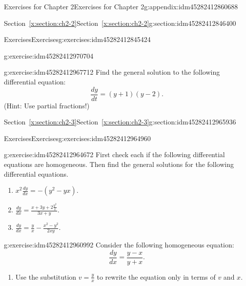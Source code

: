 \documentclass[oneside,10pt,]{book}
\numberwithin{equation}{section}
\numberwithin{equation}{section}
\begin{document}
\begin{appendixptx}{Exercises for Chapter 2}{}{Exercises for Chapter 2}{}{}{g:appendix:idm45282412860688}
\begin{sectionptx}{Section~\ref*{x:section:ch2-2}}{}{Section~\ref*{x:section:ch2-2}}{}{}{g:section:idm45282412846400}
\begin{exercises-subsection-numberless}{Exercises}{}{Exercises}{}{}{g:exercises:idm45282412845424}
\begin{divisionexercise}{2}{}{}{g:exercise:idm45282412970704}
\begin{enumerate}[label=(\alph*)]
\end{enumerate}
\end{divisionexercise}%
\begin{divisionexercise}{3}{}{}{g:exercise:idm45282412967712}%
Find the general solution to the following differential equation:%
\begin{equation*}
\frac{dy}{dt}=\left(y+1\right)\left(y-2\right).
\end{equation*}
(Hint: Use partial fractions!)%
\end{divisionexercise}%
\end{exercises-subsection-numberless}
\end{sectionptx}
%
%
\typeout{************************************************}
\typeout{************************************************}
%
\begin{sectionptx}{Section~\ref*{x:section:ch2-3}}{}{Section~\ref*{x:section:ch2-3}}{}{}{g:section:idm45282412965936}
%
%
\typeout{************************************************}
\typeout{************************************************}
%
\begin{exercises-subsection-numberless}{Exercises}{}{Exercises}{}{}{g:exercises:idm45282412964960}
\begin{divisionexercise}{1}{}{}{g:exercise:idm45282412964672}%
First check each if the following differential equations are homogeneous. Then find the general solutions for the following differential equations.%
\begin{enumerate}[label=(\alph*)]
\item{}\({\displaystyle x^{2}\frac{dy}{dx}=-\left(y^{2}-yx\right).}\)%
\item{}\({\displaystyle \frac{dy}{dx}=\frac{x+3y+2\frac{y^{2}}{x}}{3x+y}.}\)%
\item{}\({\displaystyle \frac{dy}{dx}=\frac{y}{x}-\frac{x^{2}-y^{2}}{2xy}.}\)%
\end{enumerate}
%
\end{divisionexercise}%
\begin{divisionexercise}{2}{}{}{g:exercise:idm45282412960992}%
Consider the following homogeneous equation:%
\begin{equation*}
\frac{dy}{dx}=\frac{y-x}{y+x}.
\end{equation*}
%
\begin{enumerate}[label=(\alph*)]
\item{}Use the substitution \(v=\frac{y}{x}\) to rewrite the equation only in terms of \(v\) and \(x\).%

\end{enumerate}
\end{divisionexercise}
\end{exercises-subsection-numberless}
\end{sectionptx}
\end{appendixptx}
\end{document}
